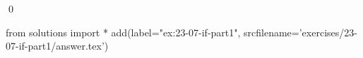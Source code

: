
\begin{ex}
  \label{ex:23-07-if-part1}
  
  \qed
\end{ex}
\begin{python0}
from solutions import *
add(label="ex:23-07-if-part1",
    srcfilename='exercises/23-07-if-part1/answer.tex')
\end{python0}
